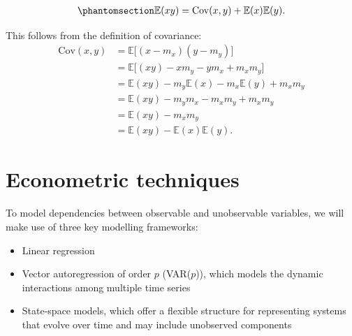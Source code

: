 \documentclass[
  letterpaper,
  DIV=11,
  numbers=noendperiod]{scrreprt}
\providecommand{\tightlist}{%
  \setlength{\itemsep}{0pt}\setlength{\parskip}{0pt}}
\begin{document}
\begin{tcolorbox}[enhanced jigsaw, arc=.35mm, bottomrule=.15mm, bottomtitle=1mm, breakable, colback=white, colbacktitle=quarto-callout-note-color!10!white, colframe=quarto-callout-note-color-frame, coltitle=black, left=2mm, leftrule=.75mm, opacityback=0, opacitybacktitle=0.6, rightrule=.15mm, title=\textcolor{quarto-callout-note-color}{\faInfo}\hspace{0.5em}{Note}, titlerule=0mm, toprule=.15mm, toptitle=1mm]

\begin{equation}\protect\phantomsection\label{eq-expectation-product}{
\begin{align}
    \mathbb{E}(xy) = \mathrm{Cov}(x,y) + \mathbb{E}(x)\mathbb{E}(y).
\end{align}
}\end{equation}

\end{tcolorbox}

This follows from the definition of covariance:
\begin{align}
    \mathrm{Cov}(x,y) &= \mathbb{E}\big[(x - m_x)(y - m_y)\big] \nonumber \\
                      &= \mathbb{E}\big[(xy) - x m_y - y m_x + m_x m_y \big] \nonumber \\
                      & = \mathbb{E}(xy) - m_y \mathbb{E}(x) - m_x \mathbb{E}(y) + m_x m_y \nonumber \\
                      & = \mathbb{E}(xy) - m_y m_x - m_x m_y + m_x m_y \nonumber \\
                      & = \mathbb{E}(xy) - m_x m_y \nonumber \\
                      & = \mathbb{E}(xy) - \mathbb{E}(x)\mathbb{E}(y).
\end{align}


\chapter{Econometric techniques}\label{econometric-techniques}

To model dependencies between observable and unobservable variables, we
will make use of three key modelling frameworks:

\begin{itemize}
\tightlist
\item
  Linear regression
\item
  Vector autoregression of order \(p\) (VAR(\(p\))), which models the
  dynamic interactions among multiple time series
\item
  State-space models, which offer a flexible structure for representing
  systems that evolve over time and may include unobserved components
\end{itemize}
\end{document}

